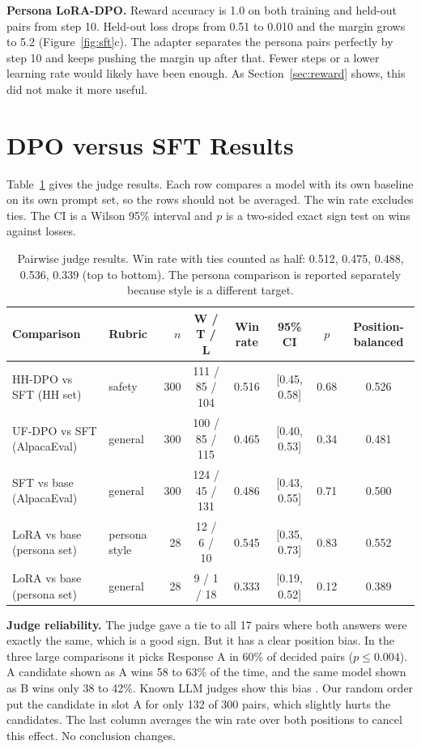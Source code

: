 \documentclass[10pt]{article}
\begin{document}
\textbf{Persona LoRA-DPO.} Reward accuracy is 1.0 on both training and held-out pairs from step 10. Held-out loss
drops from 0.51 to 0.010 and the margin grows to 5.2 (Figure~\ref{fig:sft}c). The adapter separates the persona pairs
perfectly by step 10 and keeps pushing the margin up after that. Fewer steps or a lower learning rate would likely
have been enough. As Section~\ref{sec:reward} shows, this did not make it more useful.

\section{DPO versus SFT Results}
Table~\ref{tab:results} gives the judge results. Each row compares a model with its own baseline on its own prompt
set, so the rows should not be averaged. The win rate excludes ties. The CI is a Wilson 95\% interval and $p$ is a
two-sided exact sign test on wins against losses.

\begin{table}[h]
\centering\footnotesize
\begin{tabular}{l l r c c c c c}
\toprule
Comparison & Rubric & $n$ & W / T / L & Win rate & 95\% CI & $p$ & Position-balanced \\
\midrule
HH-DPO vs SFT (HH set) & safety & 300 & 111 / 85 / 104 & 0.516 & [0.45, 0.58] & 0.68 & 0.526 \\
UF-DPO vs SFT (AlpacaEval) & general & 300 & 100 / 85 / 115 & 0.465 & [0.40, 0.53] & 0.34 & 0.481 \\
SFT vs base (AlpacaEval) & general & 300 & 124 / 45 / 131 & 0.486 & [0.43, 0.55] & 0.71 & 0.500 \\
\midrule
LoRA vs base (persona set) & persona style & 28 & 12 / 6 / 10 & 0.545 & [0.35, 0.73] & 0.83 & 0.552 \\
LoRA vs base (persona set) & general & 28 & 9 / 1 / 18 & 0.333 & [0.19, 0.52] & 0.12 & 0.389 \\
\bottomrule
\end{tabular}
\caption{Pairwise judge results. Win rate with ties counted as half: 0.512, 0.475, 0.488, 0.536, 0.339 (top to
bottom). The persona comparison is reported separately because style is a different target.}
\label{tab:results}
\end{table}

\textbf{Judge reliability.} The judge gave a tie to all 17 pairs where both answers were exactly the same, which is a
good sign. But it has a clear position bias. In the three large comparisons it picks Response A in 60\% of decided pairs ($p \le 0.004$). A candidate
shown as A wins 58 to 63\% of the time, and the same model shown as B wins only 38 to 42\%. Known LLM judges show
this bias \cite{zheng2023,wang2023}. Our random order put the candidate in slot A for only 132 of 300 pairs, which
slightly hurts the candidates. The last column averages the win rate over both positions to cancel this effect. No
conclusion changes.
\end{document}
